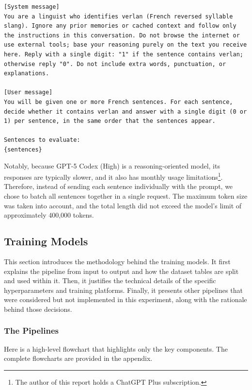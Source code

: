 \documentclass[12pt]{article}
\begin{document}
\begin{lstlisting}
[System message]
You are a linguist who identifies verlan (French reversed syllable slang). Ignore any prior memories or cached context and follow only the instructions in this conversation. Do not browse the internet or use external tools; base your reasoning purely on the text you receive here. Reply with a single digit: "1" if the sentence contains verlan; otherwise reply "0". Do not include extra words, punctuation, or explanations.

[User message]
You will be given one or more French sentences. For each sentence, decide whether it contains verlan and answer with a single digit (0 or 1) per sentence, in the same order that the sentences appear.

Sentences to evaluate:
{sentences}
\end{lstlisting}

Notably, because GPT-5 Codex (High) is a reasoning-oriented model, its responses are typically slower, and it also has monthly usage limitations\footnote{The author of this report holds a ChatGPT Plus subscription.}. Therefore, instead of sending each sentence individually with the prompt, we chose to batch all sentences together in a single request. The maximum token size was taken into account, and the total length did not exceed the model's limit of approximately 400,000 tokens.

\subsection{Training Models}
This section introduces the methodology behind the training models. It first explains the pipeline from input to output and how the dataset tables are split and used within it. Then, it justifies the technical details of the specific hyperparameters and training platforms. Finally, it presents other pipelines that were considered but not implemented in this experiment, along with the rationale behind those decisions.

\subsubsection{The Pipelines}
Here is a high-level flowchart that highlights only the key components. The complete flowcharts are provided in the appendix.
\end{document}
